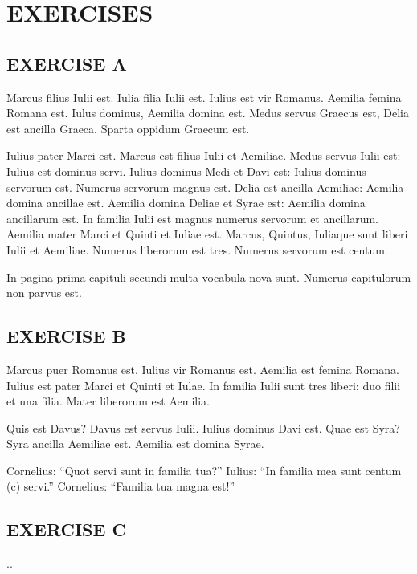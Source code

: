 \nolinenumbers

\section[Exercises]{EXERCISES}
\subsection*{EXERCISE A}
Marcus filius Iulii est. Iulia filia Iulii est. Iulius est vir Romanus. Aemilia femina Romana est. Iulus dominus, Aemilia domina est. Medus servus Graecus est, Delia est ancilla Graeca. Sparta oppidum Graecum est.

Iulius pater Marci est. Marcus est filius Iulii et Aemiliae. Medus servus Iulii est: Iulius est dominus servi. Iulius dominus Medi et Davi est: Iulius dominus servorum est. Numerus servorum magnus est. Delia est ancilla Aemiliae: Aemilia domina ancillae est. Aemilia domina Deliae et Syrae est: Aemilia domina ancillarum est. In familia Iulii est magnus numerus servorum et ancillarum. Aemilia mater Marci et Quinti et Iuliae est. Marcus, Quintus, Iuliaque sunt liberi Iulii et Aemiliae. Numerus liberorum est tres. Numerus servorum est centum.

In pagina prima capituli secundi multa vocabula nova sunt. Numerus capitulorum non parvus est.

\subsection*{EXERCISE B}
Marcus puer Romanus est. Iulius vir Romanus est. Aemilia est femina Romana. Iulius est pater Marci et Quinti et Iulae. In familia Iulii sunt tres liberi: duo filii et una filia. Mater liberorum est Aemilia.

Quis est Davus? Davus est servus Iulii. Iulius dominus Davi est. Quae est Syra? Syra ancilla Aemiliae est. Aemilia est domina Syrae.

Cornelius: ``Quot servi sunt in familia tua?'' Iulius: ``In familia mea sunt centum (\smallc c) servi.'' Cornelius: ``Familia tua magna est!''



\subsection*{EXERCISE C}
..
